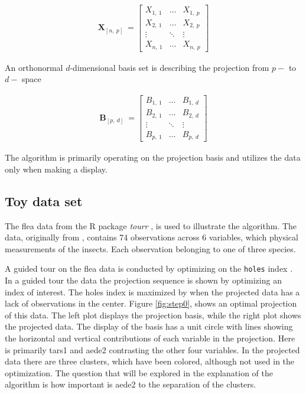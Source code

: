 \documentclass{monashthesis}
\begin{document}
\begin{align*}
  \textbf{X}_{[n,~p]} ~=
  \begin{bmatrix}
    X_{1,~1} & \dots  & X_{1,~p} \\
    X_{2,~1} & \dots  & X_{2,~p} \\
    \vdots   & \ddots & \vdots   \\
    X_{n,~1} & \dots  & X_{n,~p}
  \end{bmatrix}
\end{align*}

An orthonormal \(d\)-dimensional basis set is describing the projection
from \(p-\) to \(d-\) space

\begin{align*}
  \textbf{B}_{[p,~d]} ~=
  \begin{bmatrix}
    B_{1,~1} & \dots  & B_{1,~d} \\
    B_{2,~1} & \dots  & B_{2,~d} \\
    \vdots   & \ddots & \vdots   \\
    B_{p,~1} & \dots  & B_{p,~d}
  \end{bmatrix}
\end{align*}

The algorithm is primarily operating on the projection basis and
utilizes the data only when making a display.

\subsection{Toy data set}\label{toy-data-set-1}

The flea data from the R package \emph{tourr}
\autocite{wickham_tourr_2011}, is used to illustrate the algorithm. The
data, originally from \textcite{lubischew_use_1962}, contains 74
observations across 6 variables, which physical measurements of the
insects. Each observation belonging to one of three species.

A guided tour on the flea data is conducted by optimizing on the
\texttt{holes} index \autocite{cook_interactive_2007}. In a guided tour
the data the projection sequence is shown by optimizing an index of
interest. The holes index is maximized by when the projected data has a
lack of observations in the center. Figure \ref{fig:step0}, shows an
optimal projection of this data. The left plot displays the projection
basis, while the right plot shows the projected data. The display of the
basis has a unit circle with lines showing the horizontal and vertical
contributions of each variable in the projection. Here is primarily
tars1 and aede2 contrasting the other four variables. In the projected
data there are three clusters, which have been colored, although not
used in the optimization. The question that will be explored in the
explanation of the algorithm is how important is aede2 to the separation
of the clusters.
\end{document}
